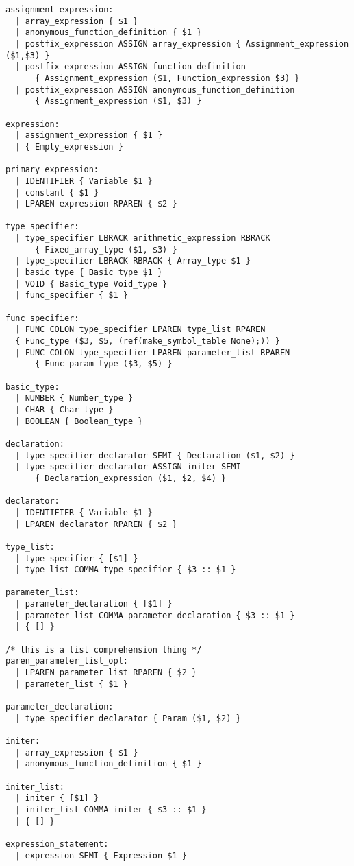 \begin{verbatim}
assignment_expression:
  | array_expression { $1 }
  | anonymous_function_definition { $1 }
  | postfix_expression ASSIGN array_expression { Assignment_expression ($1,$3) }
  | postfix_expression ASSIGN function_definition
      { Assignment_expression ($1, Function_expression $3) }
  | postfix_expression ASSIGN anonymous_function_definition
      { Assignment_expression ($1, $3) }

expression:
  | assignment_expression { $1 }
  | { Empty_expression }

primary_expression:
  | IDENTIFIER { Variable $1 }
  | constant { $1 }
  | LPAREN expression RPAREN { $2 }

type_specifier: 
  | type_specifier LBRACK arithmetic_expression RBRACK
      { Fixed_array_type ($1, $3) }
  | type_specifier LBRACK RBRACK { Array_type $1 }
  | basic_type { Basic_type $1 }
  | VOID { Basic_type Void_type }
  | func_specifier { $1 }

func_specifier:
  | FUNC COLON type_specifier LPAREN type_list RPAREN
  { Func_type ($3, $5, (ref(make_symbol_table None);)) }
  | FUNC COLON type_specifier LPAREN parameter_list RPAREN
      { Func_param_type ($3, $5) }

basic_type:
  | NUMBER { Number_type }
  | CHAR { Char_type }
  | BOOLEAN { Boolean_type }

declaration:
  | type_specifier declarator SEMI { Declaration ($1, $2) }
  | type_specifier declarator ASSIGN initer SEMI
      { Declaration_expression ($1, $2, $4) }

declarator:
  | IDENTIFIER { Variable $1 }
  | LPAREN declarator RPAREN { $2 }

type_list:
  | type_specifier { [$1] }
  | type_list COMMA type_specifier { $3 :: $1 }

parameter_list:
  | parameter_declaration { [$1] }
  | parameter_list COMMA parameter_declaration { $3 :: $1 }
  | { [] }

/* this is a list comprehension thing */
paren_parameter_list_opt:
  | LPAREN parameter_list RPAREN { $2 }
  | parameter_list { $1 }

parameter_declaration:
  | type_specifier declarator { Param ($1, $2) }

initer:
  | array_expression { $1 }
  | anonymous_function_definition { $1 }

initer_list:
  | initer { [$1] }
  | initer_list COMMA initer { $3 :: $1 }
  | { [] }

expression_statement:
  | expression SEMI { Expression $1 }


\end{verbatim}
